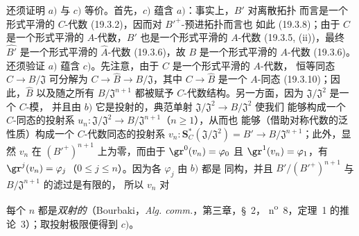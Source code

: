 \begin{env}[19.5.4.4]
\label{0.19.5.4.4-fr}
还须证明 $a)$ 与 $c)$ 等价。首先，$c)$ 蕴含 $a)$：事实上，$B'$ 对离散拓扑
而言是一个形式平滑的 $C$-代数 (19.3.2)，因而对 ${B'}^+$-预进拓扑而言也
如此 (19.3.8)；由于 $C$ 是一个形式平滑的 $A$-代数，$B'$ 也是一个形式平滑的
$A$-代数 (19.3.5, (ii))，最终 $\widehat{B'}$ 是一个形式平滑的
$\widehat A$-代数 (19.3.6)，故 $B$ 是一个形式平滑的 $A$-代数 (19.3.6)。
还须验证 $a)$ 蕴含 $c)$。先注意，由于 $C$ 是一个形式平滑的 $A$-代数，
恒等同态 $C\to B/\mathfrak J$ 可分解为
$C\to\widehat B\to B/\mathfrak J$，其中 $C\to\widehat B$ 是一个 $A$-同态
(19.3.10)；因此，$\widehat B$ 以及随之所有 $B/\mathfrak J^{n+1}$ 都被赋予
$C$-代数结构。另一方面，因为 $\mathfrak J/\mathfrak J^2$ 是一个 $C$-模，
并且由 $b)$ 它是投射的，典范单射 $\mathfrak J/\mathfrak J^2\to B/\mathfrak J^2$ 使我们
能够构成一个 $C$-同态的投射系
$u_n:\mathfrak J/\mathfrak J^2\to B/\mathfrak J^{n+1}$（$n\geq1$），从而也
能够（借助对称代数的泛性质）构成一个 $C$-代数同态的投射系
$v_n:\mathbf S_C^*(\mathfrak J/\mathfrak J^2)=B'\to
B/\mathfrak J^{n+1}$；此外，显然 $v_n$ 在 $({B'}^+)^{n+1}$ 上为零，而由于
$\gr^0(v_n)=\varphi_0$ 且 $\gr^1(v_n)=\varphi_1$，有
$\gr^j(v_n)=\varphi_j$（$0\leq j\leq n$）。因为各 $\varphi_j$ 由 $b)$ 都是
同构，并且 $B'/({B'}^+)^{n+1}$ 与 $B/\mathfrak J^{n+1}$ 的滤过是有限的，
所以 $v_n$ 对


每个 $n$ 都是\emph{双射的}（Bourbaki，\emph{Alg. comm.}，第三章，§~2，
n\textsuperscript{o}~8，定理~1 的推论~3）；取投射极限便得到 $c)$。
\end{env}

